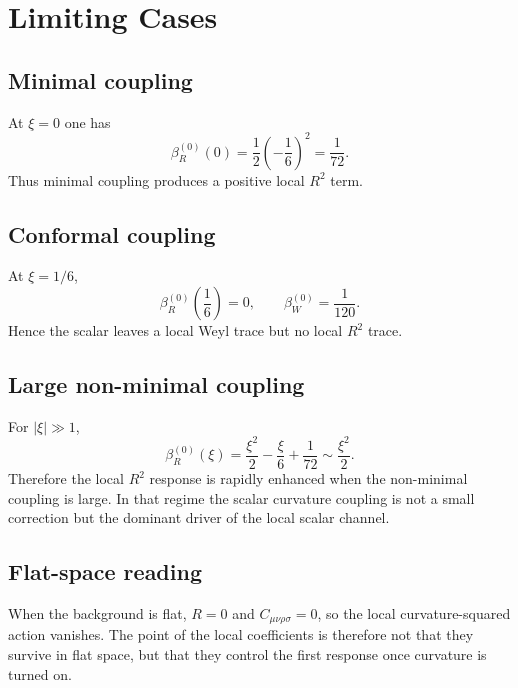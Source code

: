 \documentclass[11pt,a4paper]{article}
\theoremstyle{definition}
\theoremstyle{remark}
\begin{document}
\section{Limiting Cases}
\label{sec:limits}

\subsection{Minimal coupling}

At $\xi = 0$ one has
\begin{equation}
  \beta_R^{(0)}(0)
  = \frac{1}{2}\left(-\frac{1}{6}\right)^2
  = \frac{1}{72}.
  \label{eq:minimal}
\end{equation}
Thus minimal coupling produces a positive local $R^2$ term.

\subsection{Conformal coupling}

At $\xi = 1/6$,
\begin{equation}
  \beta_R^{(0)}\!\left(\frac{1}{6}\right) = 0,
  \qquad
  \beta_W^{(0)} = \frac{1}{120}.
  \label{eq:conformal}
\end{equation}
Hence the scalar leaves a local Weyl trace but no local $R^2$ trace.

\subsection{Large non-minimal coupling}

For $|\xi| \gg 1$,
\begin{equation}
  \beta_R^{(0)}(\xi)
  = \frac{\xi^2}{2} - \frac{\xi}{6} + \frac{1}{72}
  \sim \frac{\xi^2}{2}.
  \label{eq:large-xi}
\end{equation}
Therefore the local $R^2$ response is rapidly enhanced when the non-minimal
coupling is large.  In that regime the scalar curvature coupling is not a
small correction but the dominant driver of the local scalar channel.

\subsection{Flat-space reading}

When the background is flat, $R=0$ and $C_{\mu\nu\rho\sigma}=0$, so the local
curvature-squared action vanishes.  The point of the local coefficients is
therefore not that they survive in flat space, but that they control the
first response once curvature is turned on.
\end{document}
